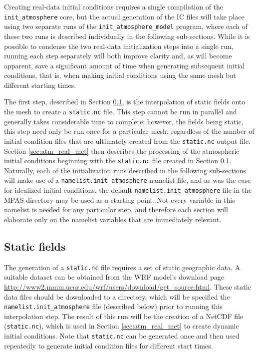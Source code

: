 Creating real-data initial conditions requires a single compilation of the {\tt init\_atmosphere} core, but the actual generation of
the IC files will take place using two separate runs of the {\tt init\_atmosphere\_model} program, where each of these two runs is described individually in the following sub-sections.  While it is possible to condense the two real-data initialization steps into a single run, running each step separately will both improve clarity and, as will become apparent, save a significant amount of time when generating subsequent initial conditions, that is, when making initial conditions using the same mesh but different starting times.

The first step, described in Section \ref{sec:atm_real_static}, is the interpolation of static fields onto the mesh to
create a {\tt static.nc} file.  This step cannot be run in parallel and generally takes considerable time to complete;
however, the fields being static, this step need only be run once for a particular mesh, regardless of the number of initial
condition files that are ultimately created from the {\tt static.nc} output file. Section \ref{sec:atm_real_met} then describes the processing of the atmospheric initial conditions beginning with the {\tt static.nc} file created in Section \ref{sec:atm_real_static}.  Naturally, each of the initialization runs described in the following sub-sections will make use of a {\tt namelist.init\_atmosphere} namelist file, and as was the case for idealized initial conditions, the default {\tt namelist.init\_atmosphere} file in the MPAS directory may be used as a starting point.  Not every variable in this namelist is needed for any particular step, and therefore each section will elaborate only on the namelist variables that are immediately relevant.

\subsection{Static fields}
\label{sec:atm_real_static}

The generation of a {\tt static.nc} file requires a set of static geographic data.  A suitable dataset can be obtained from the WRF model's download page \\
 \url{http://www2.mmm.ucar.edu/wrf/users/download/get\_source.html}.  These static data files should be downloaded to a directory,
which will be specified the {\tt namelist.init\_atmosphere} file (described below) prior to running this interpolation step.  The
result of this run will be the creation of a NetCDF file ({\tt static.nc}), which is used in Section \ref{sec:atm_real_met} to create dynamic initial conditions.  Note that {\tt static.nc} can be generated once and then used repeatedly to generate initial condition files for different start times.

